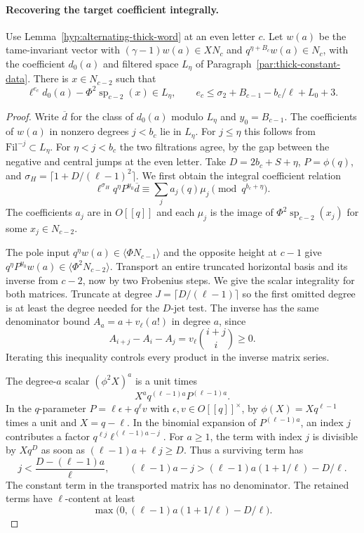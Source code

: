 \paragraph{Recovering the target coefficient integrally.}
\begin{lemma}
Use Lemma~\ref{hyp:alternating-thick-word} at an even letter \(c\).
Let \(w(a)\) be the tame-invariant vector with
\((\gamma-1)w(a)\in XN_c\) and \(q^{\eta+B_c}w(a)\in N_c\),
with the coefficient \(d_0(a)\) and filtered space \(L_\eta\)
of Paragraph~\ref{par:thick-constant-data}. There is
\(x\in N_{c-2}\) such that
\[
 \ell^{e_c}d_0(a)-\Phi^2\operatorname{sp}_{c-2}(x)\in L_\eta,\qquad
 e_c\le\sigma_2+B_{c-1}-b_c/\ell+L_0+3.
\]
\end{lemma}
\begin{proof}
Write \(\overline d\) for the class of \(d_0(a)\) modulo \(L_\eta\)
and \(y_0=B_{c-1}\). The coefficients of \(w(a)\)
in nonzero degrees \(j<b_c\) lie in \(L_\eta\). For \(j\le\eta\)
this follows from \(\mathrm{Fil}^{-j}\subset L_\eta\).
For \(\eta<j<b_c\) the two filtrations agree, by the gap
between the negative and central jumps at the even letter.
Take \(D=2b_c+S+\eta\), \(P=\phi(q)\), and
\(\sigma_H=\lceil 1+D/(\ell-1)^2\rceil\).
We first obtain the integral coefficient relation
\[
 \ell^{\sigma_H}q^\eta P^{y_0}\overline d
       \equiv \sum_j a_j(q)\mu_j \pmod{q^{b_c+\eta}} .
\]
The coefficients \(a_j\) are in \(O[[q]]\) and each \(\mu_j\) is
the image of \(\Phi^2\operatorname{sp}_{c-2}(x_j)\) for some
\(x_j\in N_{c-2}\).

The pole input \(q^\eta w(a)\in\langle\Phi N_{c-1}\rangle\)
and the opposite height at \(c-1\) give
\(q^\eta P^{y_0}w(a)\in\langle\Phi^2 N_{c-2}\rangle\).
Transport an entire truncated horizontal basis and its inverse
from \(c-2\), now by two Frobenius steps. We give the scalar
integrality for both matrices. Truncate at degree
\(J=\lceil D/(\ell-1)\rceil\) so the first omitted degree is at
least the degree needed for the \(D\)-jet test. The inverse has the
same denominator bound \(A_a=a+v_\ell(a!)\) in degree \(a\),
since
\[
 A_{i+j}-A_i-A_j=v_\ell\binom{i+j}{i}\ge0.
\]
Iterating this inequality controls every product in the inverse matrix series.

The degree-\(a\) scalar \((\phi^2 X)^a\) is a unit times
\[
        X^a q^{(\ell-1)a}P^{(\ell-1)a}.
\]
In the \(q\)-parameter \(P=\ell\epsilon+q^\ell v\) with
\(\epsilon,v\in O[[q]]^\times\), by
\(\phi(X)=Xq^{\ell-1}\) times a unit and \(X=q-\ell\).
In the binomial expansion of \(P^{(\ell-1)a}\), an index \(j\)
contributes a factor \(q^{\ell j}\ell^{(\ell-1)a-j}\).
For \(a\ge1\), the term with index \(j\) is divisible by \(Xq^D\) as soon as \((\ell-1)a+\ell j\ge D\). Thus a surviving term has
\[
 j<\frac{D-(\ell-1)a}{\ell},\qquad
 (\ell-1)a-j>(\ell-1)a(1+1/\ell)-D/\ell .
\]
The constant term in the transported matrix has no denominator. The retained terms
have \(\ell\)-content at least
\[
\max\bigl(0,(\ell-1)a(1+1/\ell)-D/\ell\bigr).
\]


\end{proof}
